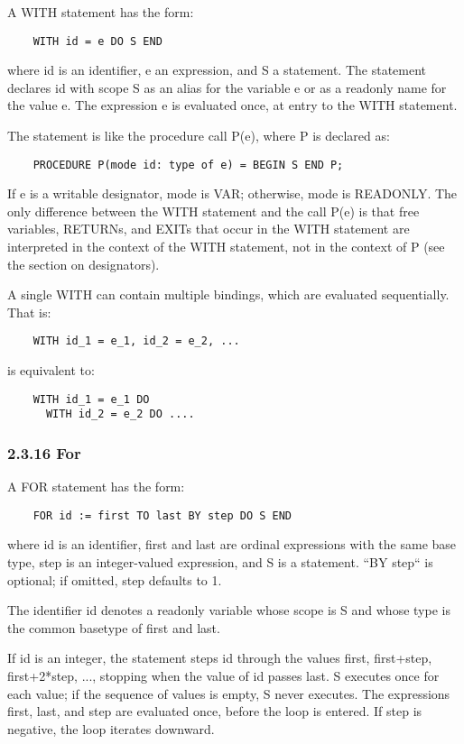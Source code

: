 \documentclass[10pt]{article}
\begin{document}
  A WITH statement has the form: 
\begin{verbatim}
    WITH id = e DO S END
\end{verbatim}
 where id is an identifier, e an expression, and S a statement. The statement declares id with scope S as an alias for the variable e or as a readonly name for the value e. The expression e is evaluated once, at entry to the WITH statement. 


  The statement is like the procedure call P(e), where P is declared as: 
\begin{verbatim}
    PROCEDURE P(mode id: type of e) = BEGIN S END P;
\end{verbatim}
 If e is a writable designator, mode is VAR; otherwise, mode is READONLY. The only difference between the WITH statement and the call P(e) is that free variables, RETURNs, and EXITs that occur in the WITH statement are interpreted in the context of the WITH statement, not in the context of P (see the section on designators). 


 A single WITH can contain multiple bindings, which are evaluated sequentially. That is: 
\begin{verbatim}
    WITH id_1 = e_1, id_2 = e_2, ...
\end{verbatim}
 is equivalent to: 
\begin{verbatim}
    WITH id_1 = e_1 DO
      WITH id_2 = e_2 DO ....
\end{verbatim}



 
\subsubsection*{2.3.16 For}


  A FOR statement has the form: 
\begin{verbatim}
    FOR id := first TO last BY step DO S END
\end{verbatim}
 where id is an identifier, first and last are ordinal expressions with the same base type, step is an integer-valued expression, and S is a statement. ``BY step`` is optional; if omitted, step defaults to 1. 


  The identifier id denotes a readonly variable whose scope is S and whose type is the common basetype of first and last. 


  If id is an integer, the statement steps id through the values first, first+step, first+2*step, ..., stopping when the value of id passes last. S executes once for each value; if the sequence of values is empty, S never executes. The expressions first, last, and step are evaluated once, before the loop is entered. If step is negative, the loop iterates downward. 
\end{document}
